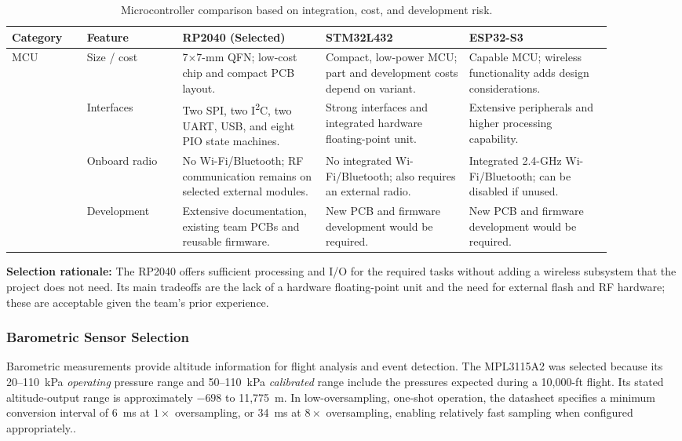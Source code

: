 \documentclass[11pt]{IEEEtran}
\begin{document}
\begin{table}[H]
\centering\small
\begin{tabular}{@{}p{0.11\linewidth}p{0.14\linewidth}p{0.215\linewidth}p{0.215\linewidth}p{0.215\linewidth}@{}}
\toprule
\textbf{Category} & \textbf{Feature} & \textbf{RP2040 (Selected)} & \textbf{STM32L432} & \textbf{ESP32-S3} \\
\midrule
\multirow{4}{*}{MCU}
 & Size / cost & 7$\times$7-mm QFN; low-cost chip and compact PCB layout. & Compact, low-power MCU; part and development costs depend on variant. & Capable MCU; wireless functionality adds design considerations. \\ \cmidrule{2-5}
 & Interfaces & Two SPI, two I\textsuperscript{2}C, two UART, USB, and eight PIO state machines. & Strong interfaces and integrated hardware floating-point unit. & Extensive peripherals and higher processing capability. \\ \cmidrule{2-5}
 & Onboard radio & No Wi-Fi/Bluetooth; RF communication remains on selected external modules. & No integrated Wi-Fi/Bluetooth; also requires an external radio. & Integrated 2.4-GHz Wi-Fi/Bluetooth; can be disabled if unused. \\ \cmidrule{2-5}
 & Development & Extensive documentation, existing team PCBs and reusable firmware. & New PCB and firmware development would be required. & New PCB and firmware development would be required. \\
\bottomrule
\end{tabular}
\vspace{3mm}
\caption{Microcontroller comparison based on integration, cost, and development risk.}
\label{tab:MCU_Comparison}
\end{table}

\noindent\textbf{Selection rationale:} The RP2040 offers sufficient processing and I/O for the required tasks without adding a wireless subsystem that the project does not need. Its main tradeoffs are the lack of a hardware floating-point unit and the need for external flash and RF hardware; these are acceptable given the team's prior experience.

\subsubsection{Barometric Sensor Selection}
Barometric measurements provide altitude information for flight analysis and event detection. The MPL3115A2 was selected because its 20--110~kPa \emph{operating} pressure range and 50--110~kPa \emph{calibrated} range include the pressures expected during a 10,000-ft flight. Its stated altitude-output range is approximately $-698$ to 11,775~m. In low-oversampling, one-shot operation, the datasheet specifies a minimum conversion interval of 6~ms at $1\times$ oversampling, or 34~ms at $8\times$ oversampling, enabling relatively fast sampling when configured appropriately.\cite{mpl,bmp390,bmp581}.
\end{document}
